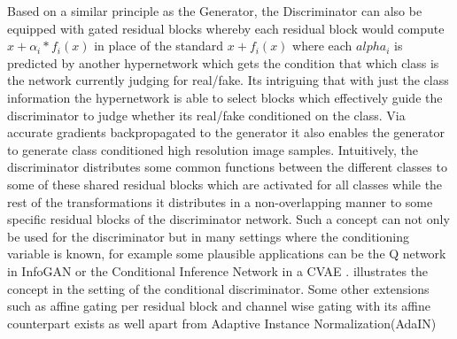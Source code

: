 Based on a similar principle as the Generator, the Discriminator can also be equipped with gated residual blocks whereby each residual block would compute $x+\alpha_i*f_i(x)$ in place of the standard $x+f_i(x)$ where each $alpha_i$ is predicted by another hypernetwork which gets the condition that which class is the network currently judging for real/fake. Its intriguing that with just the class information the hypernetwork is able to select blocks which effectively guide the discriminator to judge whether its real/fake conditioned on the class. Via accurate gradients backpropagated to the generator it also enables the generator to generate class conditioned high resolution image samples. Intuitively, the discriminator distributes some common functions between the different classes to some of these shared residual blocks which are activated for all classes while the rest of the transformations it distributes in a non-overlapping manner to some specific residual blocks of the discriminator network. Such a concept can not only be used for the discriminator but in many settings where the conditioning variable is known, for example some plausible applications can be the Q network in InfoGAN\cite{chen2016infogan} or the Conditional Inference Network in a CVAE \cite{sohn2015learning}.  illustrates the concept in the setting of the conditional discriminator. Some other extensions such as affine gating per residual block and channel wise gating with its affine counterpart exists as well apart from Adaptive Instance Normalization(AdaIN) \cite{huang2017arbitrary}

